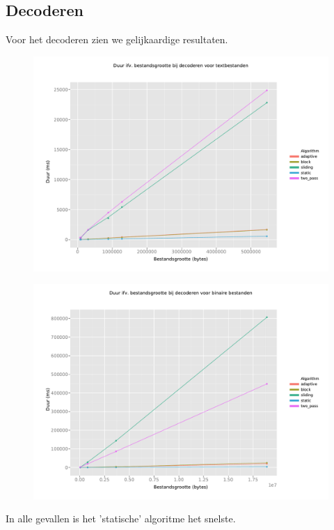 \documentclass[a4paper,12pt]{report}
\begin{document}
\subsection{Decoderen}
Voor het decoderen zien we gelijkaardige resultaten.
\begin{figure}[H]
	\includegraphics[scale=.6]{../experimenten/grafieken/duur/decode_textbestanden}
\end{figure}
\begin{figure}[H]
	\includegraphics[scale=.6]{../experimenten/grafieken/duur/decode_binaire_bestanden}
\end{figure}
In alle gevallen is het 'statische' algoritme het snelste.
\end{document}
